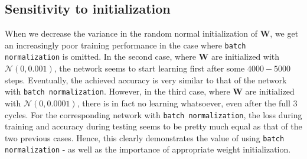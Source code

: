 \documentclass{article}
\begin{document}
\subsection*{Sensitivity to initialization}
	When we decrease the variance in the random normal initialization of $\bm{W}$, we get an increasingly poor training performance in the case where \texttt{batch normalization} is omitted. In the second case, where $\bm{W}$ are initialized with $\mathcal{N}(0, 0.001)$, the network seems to start learning first after some $4000-5000$ steps. Eventually, the achieved accuracy is very similar to that of the network with \texttt{batch normalization}. However, in the third case, where $\bm{W}$ are initialized with $\mathcal{N}(0, 0.0001)$, there is in fact no learning whatsoever, even after the full $3$ cycles. For the corresponding network with \texttt{batch normalization}, the loss during training and accuracy during testing seems to be pretty much equal as that of the two previous cases. Hence, this clearly demonstrates the value of using \texttt{batch normalization} - as well as the importance of appropriate weight initialization.
\end{document}
